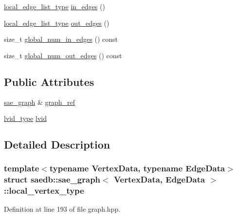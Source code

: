 \begin{DoxyCompactItemize}
\item 
\hyperlink{structsaedb_1_1sae__graph_1_1local__edge__list__type}{local\-\_\-edge\-\_\-list\-\_\-type} \hyperlink{structsaedb_1_1sae__graph_1_1local__vertex__type_aa4fbcfe4860c17774e3c7c1ef5b92ab1}{in\-\_\-edges} ()
\item 
\hyperlink{structsaedb_1_1sae__graph_1_1local__edge__list__type}{local\-\_\-edge\-\_\-list\-\_\-type} \hyperlink{structsaedb_1_1sae__graph_1_1local__vertex__type_a960b4172ab9804664fc72cde6e9a9498}{out\-\_\-edges} ()
\item 
size\-\_\-t \hyperlink{structsaedb_1_1sae__graph_1_1local__vertex__type_aec0b8c1ef8b40bc43841a1546a3e18d1}{global\-\_\-num\-\_\-in\-\_\-edges} () const 
\item 
size\-\_\-t \hyperlink{structsaedb_1_1sae__graph_1_1local__vertex__type_a4b6d4f2b21044be053e61e4e5b909c60}{global\-\_\-num\-\_\-out\-\_\-edges} () const 
\end{DoxyCompactItemize}
\subsection*{Public Attributes}
\begin{DoxyCompactItemize}
\item 
\hyperlink{classsaedb_1_1sae__graph}{sae\-\_\-graph} \& \hyperlink{structsaedb_1_1sae__graph_1_1local__vertex__type_ac373fad8819c0a5a52534d5446189b24}{graph\-\_\-ref}
\item 
\hyperlink{classsaedb_1_1sae__graph_afcd2ad6444e374e40a7a5ee4c46be052}{lvid\-\_\-type} \hyperlink{structsaedb_1_1sae__graph_1_1local__vertex__type_a551f1e6b9c35f4849cf009e7a4c8e058}{lvid}
\end{DoxyCompactItemize}


\subsection{Detailed Description}
\subsubsection*{template$<$typename Vertex\-Data, typename Edge\-Data$>$struct saedb\-::sae\-\_\-graph$<$ Vertex\-Data, Edge\-Data $>$\-::local\-\_\-vertex\-\_\-type}



Definition at line 193 of file graph.\-hpp.



